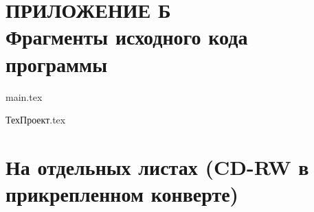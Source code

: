 \section{ПРИЛОЖЕНИЕ Б \\ Фрагменты исходного кода программы}

main.tex


ТехПроект.tex


\section[МЕСТО ДЛЯ ДИСКА]{На отдельных листах (CD-RW в прикрепленном конверте)} %